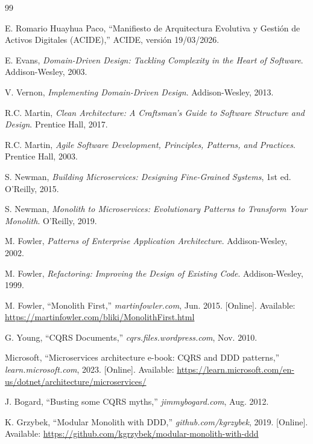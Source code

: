 \documentclass[conference]{IEEEtran}
\begin{document}
\begin{thebibliography}{99}

E. Romario Huayhua Paco, ``Manifiesto de Arquitectura Evolutiva y Gesti\'on de Activos Digitales (ACIDE),'' ACIDE, versi\'on 19/03/2026.

E. Evans, \textit{Domain-Driven Design: Tackling Complexity in the Heart of Software}. Addison-Wesley, 2003.

V. Vernon, \textit{Implementing Domain-Driven Design}. Addison-Wesley, 2013.

R.C. Martin, \textit{Clean Architecture: A Craftsman's Guide to Software Structure and Design}. Prentice Hall, 2017.

R.C. Martin, \textit{Agile Software Development, Principles, Patterns, and Practices}. Prentice Hall, 2003.

S. Newman, \textit{Building Microservices: Designing Fine-Grained Systems}, 1st ed. O'Reilly, 2015.

S. Newman, \textit{Monolith to Microservices: Evolutionary Patterns to Transform Your Monolith}. O'Reilly, 2019.

M. Fowler, \textit{Patterns of Enterprise Application Architecture}. Addison-Wesley, 2002.

M. Fowler, \textit{Refactoring: Improving the Design of Existing Code}. Addison-Wesley, 1999.

M. Fowler, ``Monolith First,'' \textit{martinfowler.com}, Jun. 2015. [Online]. Available: \url{https://martinfowler.com/bliki/MonolithFirst.html}

G. Young, ``CQRS Documents,'' \textit{cqrs.files.wordpress.com}, Nov. 2010.

Microsoft, ``Microservices architecture e-book: CQRS and DDD patterns,'' \textit{learn.microsoft.com}, 2023. [Online]. Available: \url{https://learn.microsoft.com/en-us/dotnet/architecture/microservices/}

J. Bogard, ``Busting some CQRS myths,'' \textit{jimmybogard.com}, Aug. 2012.

K. Grzybek, ``Modular Monolith with DDD,'' \textit{github.com/kgrzybek}, 2019. [Online]. Available: \url{https://github.com/kgrzybek/modular-monolith-with-ddd}


\end{thebibliography}
\end{document}
